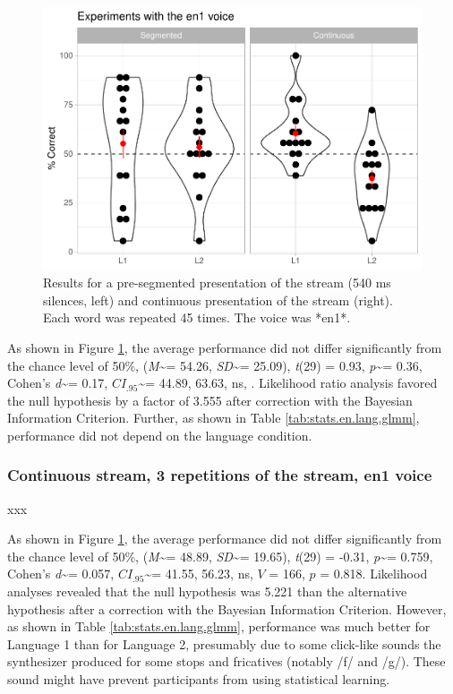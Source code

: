 \documentclass[
]{article}
\newcommand{\T}{{\em t\/}}
\newcommand{\p}{{\em p\/}}
\newcommand{\M}{{\em M\/}}
\newcommand{\SD}{{\em SD\/}}
\newcommand{\D}{Cohen's {\em d\/}}
\newcommand{\CI}{$CI_{.95}$}
\begin{document}
\begin{figure}

{\centering \includegraphics[width=0.8\linewidth]{segmentation_recall_combined_for_revision2_files/figure-latex/stats-london-stats.3x.en.segm-cont.plot-1} 

}

\caption{Results for a pre-segmented presentation of the stream (540 ms silences, left) and continuous presentation of the stream (right). Each word was repeated 45 times. The voice was *en1*.}\label{fig:stats-london-stats.3x.en.segm-cont.plot}
\end{figure}

As shown in Figure \ref{fig:stats-london-stats.3x.en.segm-cont.plot},
the average performance did not differ significantly from the chance
level of 50\%, (\M\textasciitilde= 54.26, \SD\textasciitilde= 25.09),
\T(29) = 0.93, \p\textasciitilde= 0.36, \D\textasciitilde= 0.17,
\CI\textasciitilde= 44.89, 63.63, ns, . Likelihood ratio analysis
favored the null hypothesis by a factor of 3.555 after correction with
the Bayesian Information Criterion. Further, as shown in Table
\ref{tab:stats.en.lang.glmm}, performance did not depend on the language
condition.

\hypertarget{continuous-stream-3-repetitions-of-the-stream-en1-voice}{%
\subsubsection{Continuous stream, 3 repetitions of the stream, en1
voice}\label{continuous-stream-3-repetitions-of-the-stream-en1-voice}}

xxx

As shown in Figure \ref{fig:stats-london-stats.3x.en.segm-cont.plot},
the average performance did not differ significantly from the chance
level of 50\%, (\M\textasciitilde= 48.89, \SD\textasciitilde= 19.65),
\T(29) = -0.31, \p\textasciitilde= 0.759, \D\textasciitilde= 0.057,
\CI\textasciitilde= 41.55, 56.23, ns, \(V\) = 166, \(p\) = 0.818.
Likelihood analyses revealed that the null hypothesis was 5.221 than the
alternative hypothesis after a correction with the Bayesian Information
Criterion. However, as shown in Table \ref{tab:stats.en.lang.glmm},
performance was much better for Language 1 than for Language 2,
presumably due to some click-like sounds the synthesizer produced for
some stops and fricatives (notably /f/ and /g/). These sound might have
prevent participants from using statistical learning.
\end{document}
